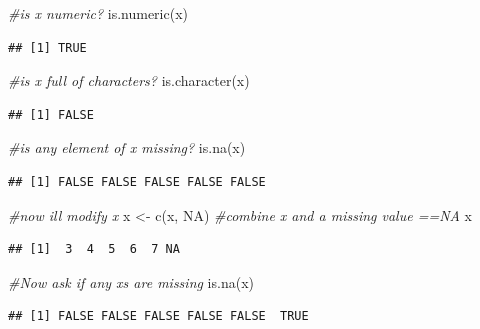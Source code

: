 \documentclass[
]{book}
\newenvironment{Shaded}{\begin{snugshade}}{\end{snugshade}}
\newcommand{\CommentTok}[1]{\textcolor[rgb]{0.56,0.35,0.01}{\textit{#1}}}
\newcommand{\ConstantTok}[1]{\textcolor[rgb]{0.00,0.00,0.00}{#1}}
\newcommand{\FunctionTok}[1]{\textcolor[rgb]{0.00,0.00,0.00}{#1}}
\newcommand{\NormalTok}[1]{#1}
\newcommand{\OtherTok}[1]{\textcolor[rgb]{0.56,0.35,0.01}{#1}}
\begin{document}
\begin{Shaded}
\begin{Highlighting}[]
\CommentTok{\#is x numeric?}
\FunctionTok{is.numeric}\NormalTok{(x)}
\end{Highlighting}
\end{Shaded}

\begin{verbatim}
## [1] TRUE
\end{verbatim}

\begin{Shaded}
\begin{Highlighting}[]
\CommentTok{\#is x full of characters?}
\FunctionTok{is.character}\NormalTok{(x)}
\end{Highlighting}
\end{Shaded}

\begin{verbatim}
## [1] FALSE
\end{verbatim}

\begin{Shaded}
\begin{Highlighting}[]
\CommentTok{\#is any element of x missing?}
\FunctionTok{is.na}\NormalTok{(x)}
\end{Highlighting}
\end{Shaded}

\begin{verbatim}
## [1] FALSE FALSE FALSE FALSE FALSE
\end{verbatim}

\begin{Shaded}
\begin{Highlighting}[]
\CommentTok{\#now i\textquotesingle{}ll modify x}
\NormalTok{x }\OtherTok{\textless{}{-}} \FunctionTok{c}\NormalTok{(x, }\ConstantTok{NA}\NormalTok{) }\CommentTok{\#combine x and a missing value ==NA}
\NormalTok{x}
\end{Highlighting}
\end{Shaded}

\begin{verbatim}
## [1]  3  4  5  6  7 NA
\end{verbatim}

\begin{Shaded}
\begin{Highlighting}[]
\CommentTok{\#Now ask if any x\textquotesingle{}s are missing}
\FunctionTok{is.na}\NormalTok{(x)}
\end{Highlighting}
\end{Shaded}

\begin{verbatim}
## [1] FALSE FALSE FALSE FALSE FALSE  TRUE
\end{verbatim}
\end{document}
